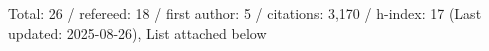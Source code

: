 Total: 26 / refereed: 18 / first author: 5 / citations: 3,170 / h-index: 17 (Last updated: 2025-08-26), List attached below